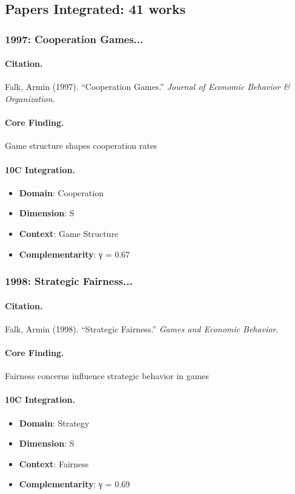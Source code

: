 \subsection{Papers Integrated: 41 works}


\subsubsection{1997: Cooperation Games...}

\paragraph{Citation.}
Falk, Armin (1997). ``Cooperation Games.''
\textit{Journal of Economic Behavior & Organization}.

\paragraph{Core Finding.}
Game structure shapes cooperation rates

\paragraph{10C Integration.}
\begin{itemize}[nosep]
  \item \textbf{Domain}: Cooperation
  \item \textbf{Dimension}: S
  \item \textbf{Context}: Game Structure
  \item \textbf{Complementarity}: γ = 0.67
\end{itemize}


\subsubsection{1998: Strategic Fairness...}

\paragraph{Citation.}
Falk, Armin (1998). ``Strategic Fairness.''
\textit{Games and Economic Behavior}.

\paragraph{Core Finding.}
Fairness concerns influence strategic behavior in games

\paragraph{10C Integration.}
\begin{itemize}[nosep]
  \item \textbf{Domain}: Strategy
  \item \textbf{Dimension}: S
  \item \textbf{Context}: Fairness
  \item \textbf{Complementarity}: γ = 0.69
\end{itemize}



